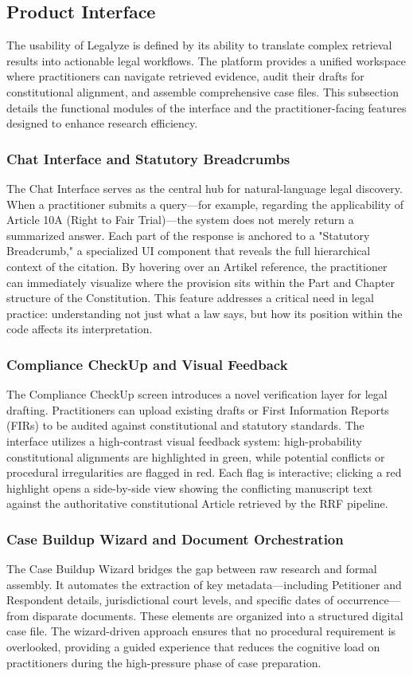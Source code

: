 \documentclass[a4paper,fleqn]{cas-dc}
\begin{document}
\subsection{Product Interface}
The usability of Legalyze is defined by its ability to translate complex retrieval results into actionable legal workflows. The platform provides a unified workspace where practitioners can navigate retrieved evidence, audit their drafts for constitutional alignment, and assemble comprehensive case files. This subsection details the functional modules of the interface and the practitioner-facing features designed to enhance research efficiency.

\subsubsection{Chat Interface and Statutory Breadcrumbs}
The Chat Interface serves as the central hub for natural-language legal discovery. When a practitioner submits a query—for example, regarding the applicability of Article 10A (Right to Fair Trial)—the system does not merely return a summarized answer. Each part of the response is anchored to a "Statutory Breadcrumb," a specialized UI component that reveals the full hierarchical context of the citation. By hovering over an Artikel reference, the practitioner can immediately visualize where the provision sits within the Part and Chapter structure of the Constitution. This feature addresses a critical need in legal practice: understanding not just what a law says, but how its position within the code affects its interpretation.

\subsubsection{Compliance CheckUp and Visual Feedback}
The Compliance CheckUp screen introduces a novel verification layer for legal drafting. Practitioners can upload existing drafts or First Information Reports (FIRs) to be audited against constitutional and statutory standards. The interface utilizes a high-contrast visual feedback system: high-probability constitutional alignments are highlighted in green, while potential conflicts or procedural irregularities are flagged in red. Each flag is interactive; clicking a red highlight opens a side-by-side view showing the conflicting manuscript text against the authoritative constitutional Article retrieved by the RRF pipeline.

\subsubsection{Case Buildup Wizard and Document Orchestration}
The Case Buildup Wizard bridges the gap between raw research and formal assembly. It automates the extraction of key metadata—including Petitioner and Respondent details, jurisdictional court levels, and specific dates of occurrence—from disparate documents. These elements are organized into a structured digital case file. The wizard-driven approach ensures that no procedural requirement is overlooked, providing a guided experience that reduces the cognitive load on practitioners during the high-pressure phase of case preparation.
\end{document}

